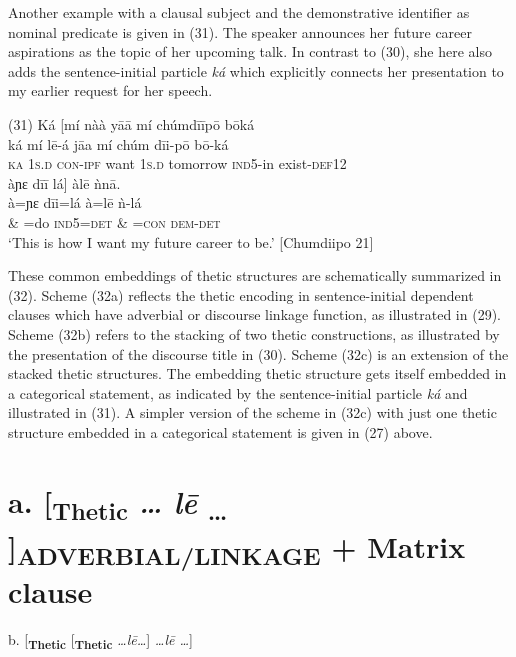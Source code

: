 \documentclass[output=paper]{langsci/langscibook}
\begin{document}
Another example with a clausal subject and the demonstrative identifier as nominal predicate is given in (31). The speaker announces her future career aspirations as the topic of her upcoming talk. In contrast to (30), she here also adds the sentence-initial particle \textit{ká }which explicitly connects her presentation to my earlier request for her speech.

\gll \textup{(31)}  Ká  \textup{[}mí    nàà    y\={a}\={a}    mí    chúmd\={i}\={i}p\={o}            b\={o}ká\\
\gll \textup{  ká   mí    l\={e}-á      j\={a}a    mí    chúm        d\={i}i-p\={o}    b\={o}-ká}\\
     \textsc{  ka}   1\textsc{s.d}  \textsc{con-ipf}    want  1\textsc{s}.\textsc{d  }tomorrow     \textsc{ind}5-in     exist-\textsc{def}12\\
\gll   àɲɛ    d\={i}\={i}   lá\textup{]    }àl\={e}    ǹn\={a}.\\
\gll \textup{  à=ɲɛ  d\={i}i=lá    à=l\={e}    ǹ-lá}\\
       \& =do  \textsc{ind}\textsc{5=}\textsc{det}\textsc{  \& =}\textsc{con}\textsc{  }\textsc{dem-det}\\
\glt ‘This is how I want my future career to be.’ [Chumdiipo 21]\\

\z

These common embeddings of thetic structures are schematically summarized in (32). Scheme (32a) reflects the thetic encoding in sentence-initial dependent clauses which have adverbial or discourse linkage function, as illustrated in (29). Scheme (32b) refers to the stacking of two thetic constructions, as illustrated by the presentation of the discourse title in (30). Scheme (32c) is an extension of the stacked thetic structures. The embedding thetic structure gets itself embedded in a categorical statement, as indicated by the sentence-initial particle \textit{ká }and illustrated in (31). A simpler version of the scheme in (32c) with just one thetic structure embedded in a categorical statement is given in (27) above. 

\chapter[a.  [Thetic … le\={ } … {]}ADVERBIAL/LINKAGE + Matrix clause ]{a.  [\textbf{\textsubscript{Thetic}} \textit{… l\={e}}\textsubscript{ … }]\textsubscript{ADVERBIAL/LINKAGE} + Matrix clause }

    b.   [\textbf{\textsubscript{Thetic}}\textsubscript{  }[\textbf{\textsubscript{Thetic}} \textit{…l\={e}…}] \textit{…l\={e} …}]
\end{document}
